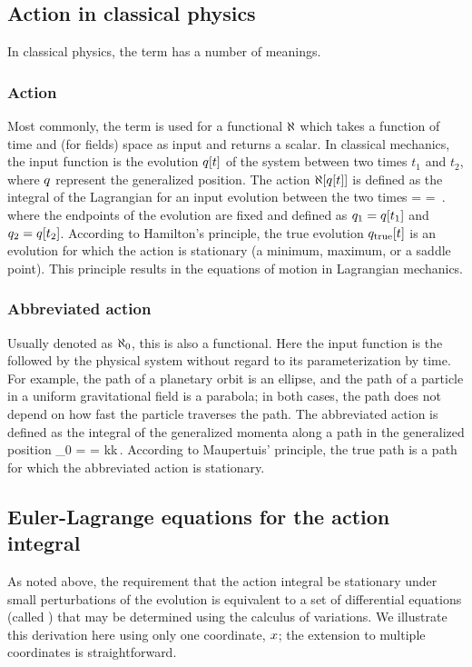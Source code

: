 \subsection{Action in classical physics}
%
In classical physics, the term  has a number of meanings.


\subsubsection{Action}
%
Most commonly, the term is used for a functional $\aleph$ which takes a function of time and (for fields) space as input and returns a scalar. In classical mechanics, the input function is the evolution $q\!\left[{t}\right]$ of the system between two times $t_1$ and $t_2$, where $q$ represent the generalized position. The action $\aleph\!\left[{q\!\left[{t}\right]}\right]$ is defined as the integral of the Lagrangian for an input evolution between the two times
%
\beq
  \action{} = 
                           = \,.
\eeq
%
where the endpoints of the evolution are fixed and defined as $q_1 = q\!\left[{t_1}\right]$ and $q_2 = q\!\left[{t_2}\right]$. According to Hamilton's principle, the true evolution $q_\text{true}\!\left[{t}\right]$ is an evolution for which the action is stationary (a minimum, maximum, or a saddle point). This principle results in the equations of motion in Lagrangian mechanics.


\subsubsection{Abbreviated action}
%
Usually denoted as $\aleph_0$, this is also a functional. Here the input function is the  followed by the physical system without regard to its parameterization by time. For example, the path of a planetary orbit is an ellipse, and the path of a particle in a uniform gravitational field is a parabola; in both cases, the path does not depend on how fast the particle traverses the path. The abbreviated action is defined as the integral of the generalized momenta along a path in the generalized position
%
\beq
  \action_0 = \int\gmom\iprod\gpos
            = \int\icov\gmom k\dx\ivec\gpos k\,.
\eeq
%
According to Maupertuis' principle, the true path is a path for which the abbreviated action is stationary.


\subsection{Euler-Lagrange equations for the action integral}
%
As noted above, the requirement that the action integral be stationary under small perturbations of the evolution is equivalent to a set of differential equations (called ) that may be determined using the calculus of variations. We illustrate this derivation here using only one coordinate, $x$; the extension to multiple coordinates is straightforward. 

